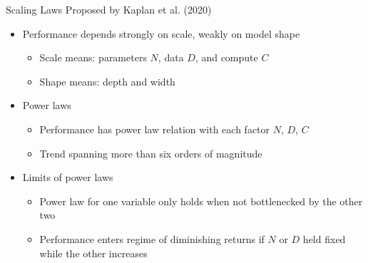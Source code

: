\documentclass[11pt,compress,t,notes=noshow, xcolor=table]{beamer}
\begin{document}
\begin{vbframe}{Scaling Laws Proposed by Kaplan et al. (2020)}
\href{https://arxiv.org/abs/2001.08361}{} 

\vfill

\begin{itemize}

	\item Performance depends strongly on scale, weakly on model shape
	\begin{itemize}
	\item Scale means: parameters $N$, data $D$, and compute $C$
	\item Shape means: depth and width
	\end{itemize}

	\item Power laws
	\begin{itemize}
	\item Performance has power law relation with each factor $N$, $D$, $C$
	\item Trend spanning more than six orders of magnitude
	\end{itemize}

	\item Limits of power laws
	\begin{itemize}
	\item Power law for one variable only holds when not bottlenecked by the other two 
	\item Performance enters regime of diminishing returns if $N$ or $D$ held fixed while the other increases
	\end{itemize}

\end{itemize}

\vfill

\end{vbframe}

\end{document}
